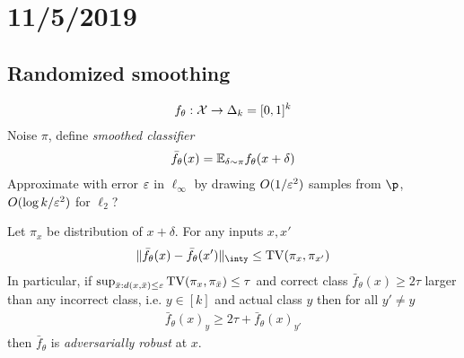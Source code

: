 \section{11/5/2019}

\subsection{Randomized smoothing}%

\begin{align}
  f_\theta : \mathcal{X} \to \Delta_k = [0,1]^k
\end{align}
Noise $\pi$, define \emph{smoothed classifier}
\begin{align}
  \bar{f}_\theta(x) = \mathbb{E}_{\delta \sim \pi} f_\theta(x+\delta)
\end{align}
Approximate with error $\varepsilon$ in $\ell_\infty$ by drawing $O(1/\varepsilon^{2})$
samples from $\p$, $O(\log k / \varepsilon^2)$ for $\ell_2$?

\begin{proposition}
  Let $\pi_x$ be distribution of $x + \delta$.
  For any inputs $x,x'$
  \begin{align}
	\|\bar{f}_\theta(x) - \bar{f}_\theta(x')\|_\inty\leq \TV(\pi_x, \pi_{x'})
  \end{align}
  In particular, if $\sup_{\bar{x} : d(x,\bar{x}) \leq \varepsilon} \operatorname{TV}(\pi_x, \pi_{\bar{x}}) \leq \tau$ and correct class $\bar{f}_\theta(x) \geq 2 \tau$
  larger than any incorrect class, i.e. $y \in [k]$ and actual class $y$
  then for all $y' \neq y$
  \begin{align}
    \bar{f}_\theta(x)_y \geq 2 \tau + \bar{f}_\theta(x)_{y'}
  \end{align}
  then $\bar{f}_\theta$ is \emph{adversarially robust} at $x$.
\end{proposition}

